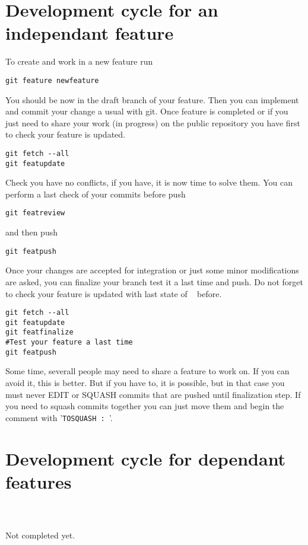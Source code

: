 \section{Development cycle for an independant feature}

To create and work in a new feature run
\begin{lstlisting}
git feature newfeature
\end{lstlisting}
You should be now in the draft branch of your feature. Then you can implement and commit your change a usual with git. Once feature is completed or if you just need to share your work (in progress) on the public repository you have first to check your feature is updated.
\begin{lstlisting}
git fetch --all
git featupdate
\end{lstlisting}
Check you have no conflicts, if you have, it is now time to solve them. You can perform a last check of your commits before push
\begin{lstlisting}
git featreview
\end{lstlisting}
and then push
\begin{lstlisting}
git featpush
\end{lstlisting}

Once your changes are accepted for integration or just some minor modifications are asked, you can finalize your branch test it a last time and push. Do not forget to check your feature is updated with last state of \DEVREF~ before.
\begin{lstlisting}
git fetch --all
git featupdate
git featfinalize
#Test your feature a last time
git featpush
\end{lstlisting}

Some time, severall people may need to share a feature to work on. If you can avoid it, this is better. But if you have to, it is possible, but in that case you must never EDIT or SQUASH commits that are pushed until finalization step. If you need to squash commits together you can just move them and begin the comment with '\texttt{TOSQUASH : }'.

\section{Development cycle for dependant features}

\begin{lstlisting}
\end{lstlisting}

\begin{lstlisting}
\end{lstlisting}

\begin{lstlisting}
\end{lstlisting}

Not completed yet.
